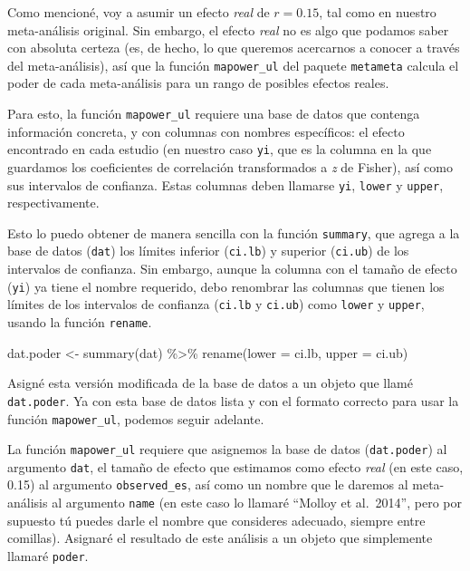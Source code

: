 \documentclass[
  bookmarksnumbered]{article}
\newenvironment{Shaded}{\begin{snugshade}}{\end{snugshade}}
\newcommand{\AttributeTok}[1]{\textcolor[rgb]{0.00,0.34,0.68}{#1}}
\newcommand{\FunctionTok}[1]{\textcolor[rgb]{0.39,0.29,0.61}{#1}}
\newcommand{\NormalTok}[1]{\textcolor[rgb]{0.12,0.11,0.11}{#1}}
\newcommand{\OtherTok}[1]{\textcolor[rgb]{0.00,0.43,0.16}{#1}}
\newcommand{\SpecialCharTok}[1]{\textcolor[rgb]{0.24,0.68,0.91}{#1}}
\begin{document}
Como mencioné, voy a asumir un efecto \emph{real} de \(r = 0.15\), tal como en nuestro meta-análisis original. Sin embargo, el efecto \emph{real} no es algo que podamos saber con absoluta certeza (es, de hecho, lo que queremos acercarnos a conocer a través del meta-análisis), así que la función \texttt{mapower\_ul} del paquete \texttt{metameta} calcula el poder de cada meta-análisis para un rango de posibles efectos reales.

Para esto, la función \texttt{mapower\_ul} requiere una base de datos que contenga información concreta, y con columnas con nombres específicos: el efecto encontrado en cada estudio (en nuestro caso \texttt{yi}, que es la columna en la que guardamos los coeficientes de correlación transformados a \emph{z} de Fisher), así como sus intervalos de confianza. Estas columnas deben llamarse \texttt{yi}, \texttt{lower} y \texttt{upper}, respectivamente.

Esto lo puedo obtener de manera sencilla con la función \texttt{summary}, que agrega a la base de datos (\texttt{dat}) los límites inferior (\texttt{ci.lb}) y superior (\texttt{ci.ub}) de los intervalos de confianza. Sin embargo, aunque la columna con el tamaño de efecto (\texttt{yi}) ya tiene el nombre requerido, debo renombrar las columnas que tienen los límites de los intervalos de confianza (\texttt{ci.lb} y \texttt{ci.ub}) como \texttt{lower} y \texttt{upper}, usando la función \texttt{rename}.

\begin{Shaded}
\begin{Highlighting}[]
\NormalTok{dat.poder }\OtherTok{\textless{}{-}} \FunctionTok{summary}\NormalTok{(dat) }\SpecialCharTok{\%\textgreater{}\%}
  \FunctionTok{rename}\NormalTok{(}\AttributeTok{lower =}\NormalTok{ ci.lb, }\AttributeTok{upper =}\NormalTok{ ci.ub)}
\end{Highlighting}
\end{Shaded}

Asigné esta versión modificada de la base de datos a un objeto que llamé \texttt{dat.poder}. Ya con esta base de datos lista y con el formato correcto para usar la función \texttt{mapower\_ul}, podemos seguir adelante.

La función \texttt{mapower\_ul} requiere que asignemos la base de datos (\texttt{dat.poder}) al argumento \texttt{dat}, el tamaño de efecto que estimamos como efecto \emph{real} (en este caso, 0.15) al argumento \texttt{observed\_es}, así como un nombre que le daremos al meta-análisis al argumento \texttt{name} (en este caso lo llamaré ``Molloy et al.~2014'', pero por supuesto tú puedes darle el nombre que consideres adecuado, siempre entre comillas). Asignaré el resultado de este análisis a un objeto que simplemente llamaré \texttt{poder}.
\end{document}
